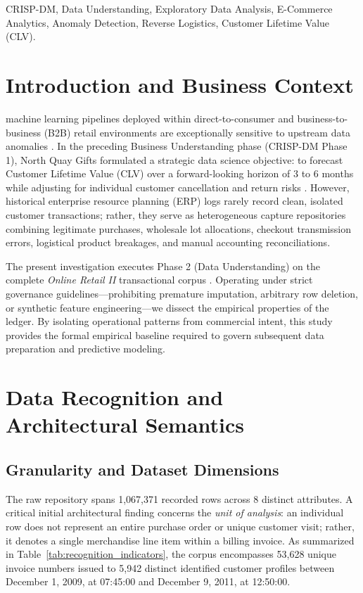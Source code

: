\documentclass[journal,10pt,twocolumn]{IEEEtran}
\begin{document}
\begin{IEEEkeywords}
CRISP-DM, Data Understanding, Exploratory Data Analysis, E-Commerce Analytics, Anomaly Detection, Reverse Logistics, Customer Lifetime Value (CLV).
\end{IEEEkeywords}

\section{Introduction and Business Context}
 machine learning pipelines deployed within direct-to-consumer and business-to-business (B2B) retail environments are exceptionally sensitive to upstream data anomalies \cite{wirth2000crisp}. In the preceding Business Understanding phase (CRISP-DM Phase 1), North Quay Gifts formulated a strategic data science objective: to forecast Customer Lifetime Value (CLV) over a forward-looking horizon of 3 to 6 months while adjusting for individual customer cancellation and return risks \cite{fader2005counting, clv2025forecasting}. However, historical enterprise resource planning (ERP) logs rarely record clean, isolated customer transactions; rather, they serve as heterogeneous capture repositories combining legitimate purchases, wholesale lot allocations, checkout transmission errors, logistical product breakages, and manual accounting reconciliations.

The present investigation executes Phase 2 (Data Understanding) on the complete \textit{Online Retail II} transactional corpus \cite{chen2012online}. Operating under strict governance guidelines—prohibiting premature imputation, arbitrary row deletion, or synthetic feature engineering—we dissect the empirical properties of the ledger. By isolating operational patterns from commercial intent, this study provides the formal empirical baseline required to govern subsequent data preparation and predictive modeling.

\section{Data Recognition and Architectural Semantics}

\subsection{Granularity and Dataset Dimensions}
The raw repository spans 1,067,371 recorded rows across 8 distinct attributes. A critical initial architectural finding concerns the \textit{unit of analysis}: an individual row does not represent an entire purchase order or unique customer visit; rather, it denotes a single merchandise line item within a billing invoice. As summarized in Table~\ref{tab:recognition_indicators}, the corpus encompasses 53,628 unique invoice numbers issued to 5,942 distinct identified customer profiles between December 1, 2009, at 07:45:00 and December 9, 2011, at 12:50:00.
\end{document}
